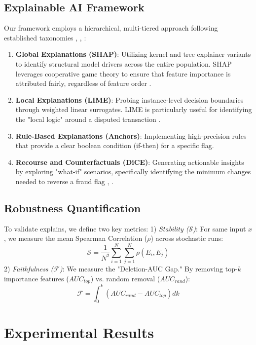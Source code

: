 \documentclass[conference]{IEEEtran}
\begin{document}
\subsection{Explainable AI Framework}
Our framework employs a hierarchical, multi-tiered approach following established taxonomies \cite{b7}, \cite{b11}, \cite{b12}:
\begin{enumerate}
    \item \textbf{Global Explanations (SHAP)}: Utilizing kernel and tree explainer variants to identify structural model drivers across the entire population. SHAP leverages cooperative game theory to ensure that feature importance is attributed fairly, regardless of feature order \cite{b2}.
    \item \textbf{Local Explanations (LIME)}: Probing instance-level decision boundaries through weighted linear surrogates. LIME is particularly useful for identifying the "local logic" around a disputed transaction \cite{b3}.
    \item \textbf{Rule-Based Explanations (Anchors)}: Implementing high-precision rules \cite{b4} that provide a clear boolean condition (if-then) for a specific flag.
    \item \textbf{Recourse and Counterfactuals (DiCE)}: Generating actionable insights by exploring "what-if" scenarios, specifically identifying the minimum changes needed to reverse a fraud flag \cite{b5}, \cite{b15}.
\end{enumerate}

\subsection{Robustness Quantification}
To validate explains, we define two key metrics:
1) \textit{Stability ($\mathcal{S}$)}: For same input $x$, we measure the mean Spearman Correlation ($\rho$) across stochastic runs:
\begin{equation}
    \mathcal{S} = \frac{1}{N^2} \sum_{i=1}^N \sum_{j=1}^N \rho(E_i, E_j)
\end{equation}
2) \textit{Faithfulness ($\mathcal{F}$)}: We measure the "Deletion-AUC Gap." By removing top-$k$ importance features ($AUC_{top}$) vs. random removal ($AUC_{rand}$):
\begin{equation}
    \mathcal{F} = \int_{0}^{k} (AUC_{rand} - AUC_{top}) dk
\end{equation}

\section{Experimental Results}
\end{document}
